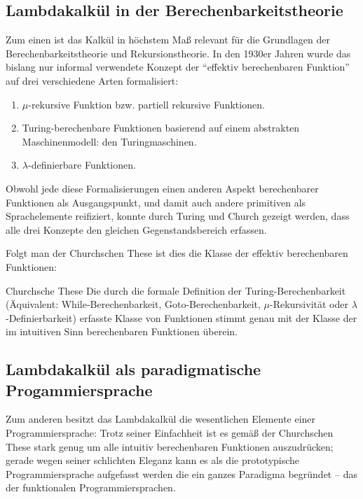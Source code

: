 \subsection{Lambdakalkül in der Berechenbarkeitstheorie}

Zum einen ist das Kalkül in höchstem Maß relevant für die Grundlagen
der Berechenbarkeitstheorie und Rekursionstheorie.
In den 1930er Jahren wurde das bislang nur informal verwendete Konzept 
der \enquote{effektiv berechenbaren Funktion} auf drei verschiedene Arten
formalisiert:

\begin{enumerate}
\item $μ$-rekursive Funktion bzw. partiell rekursive Funktionen.
\item Turing-berechenbare Funktionen basierend 
	  auf einem abstrakten Maschinenmodell: den Turingmaschinen.
\item $λ$-definierbare Funktionen.
\end{enumerate}

Obwohl jede diese Formalisierungen einen anderen Aspekt berechenbarer Funktionen
als Ausgangspunkt, und damit auch andere primitiven als Sprachelemente reifiziert,
konnte durch Turing und Church gezeigt werden, dass alle drei Konzepte den 
gleichen Gegenstandsbereich erfassen. 

Folgt man der Churchschen These ist dies die 
Klasse der effektiv berechenbaren Funktionen:

\begin{definition}{Churchsche These}
Die durch die formale Definition der Turing-Berechenbarkeit
(Äquivalent: While-Berechenbarkeit, Goto-Berechenbarkeit,
$μ$-Rekursivität oder $λ$-Definierbarkeit) erfasste Klasse von Funktionen
stimmt genau mit der Klasse der im intuitiven Sinn berechenbaren 
Funktionen überein.
\end{definition}


\subsection{Lambdakalkül als paradigmatische Progammiersprache}

Zum anderen besitzt das Lambdakalkül die wesentlichen Elemente
einer Programmiersprache:
Trotz seiner Einfachheit %
ist es gemäß der Churchschen These stark genug um alle intuitiv berechenbaren
Funktionen auszudrücken;
gerade wegen seiner schlichten Eleganz kann es als die prototypische
Programmiersprache aufgefasst werden die ein ganzes Paradigma begründet --
das der funktionalen Programmiersprachen.

